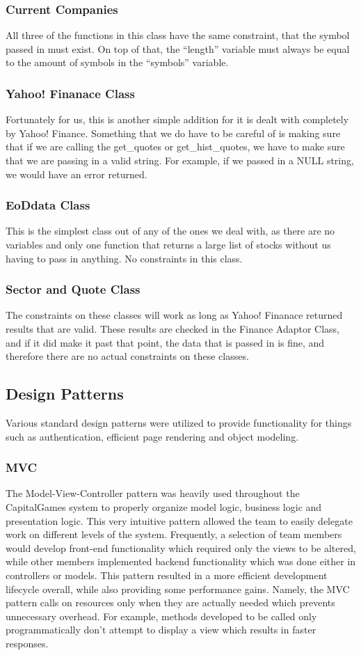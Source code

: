 \subsubsection{Current Companies}
All three of the functions in this class have the same constraint, that the symbol passed in must exist. On top of that, the ``length'' variable must always be equal to the amount of symbols in the ``symbols'' variable.
\subsubsection{Yahoo! Finanace Class}
Fortunately for us, this is another simple addition for it is dealt with completely by Yahoo! Finance. Something that we do have to be careful of is making sure that if we are calling the get\_quotes or get\_hist\_quotes, we have to make sure that we are passing in a valid string. For example, if we passed in a NULL string, we would have an error returned.
\subsubsection{EoDdata Class}
This is the simplest class out of any of the ones we deal with, as there are no variables and only one function that returns a large list of stocks without us having to pass in anything. No constraints in this class.
\subsubsection{Sector and Quote Class}
The constraints on these classes will work as long as Yahoo! Finanace returned results that are valid. These results are checked in the Finance Adaptor Class, and if it did make it past that point, the data that is passed in is fine, and therefore there are no actual constraints on these classes.


\subsection{Design Patterns}
Various standard design patterns were utilized to provide functionality for things such as authentication, efficient page rendering and object modeling.
\subsubsection{MVC}
The Model-View-Controller pattern was heavily used throughout the CapitalGames system to properly organize model logic, business logic and presentation logic. This very intuitive pattern allowed the team to easily delegate work on different levels of the system. Frequently, a selection of team members would develop front-end functionality which required only the views to be altered, while other members implemented backend functionality which was done either in controllers or models. This pattern resulted in a more efficient development lifecycle overall, while also providing some performance gains. Namely, the MVC pattern calls on resources only when they are actually needed which prevents unnecessary overhead. For example, methods developed to be called only programmatically don't attempt to display a view which results in faster responses.
